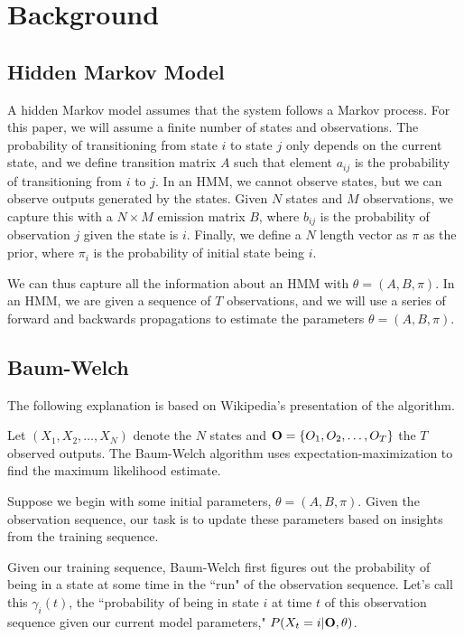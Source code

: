 \section{Background}

\subsection{Hidden Markov Model}
A hidden Markov model assumes that the system follows a Markov process. For this paper, we will assume a finite number of states and observations. The probability of transitioning from state $i$ to state $j$ only depends on the current state, and we define transition matrix $A$ such that element $a_{ij}$ is the probability  of transitioning from $i$ to $j$. In an HMM, we cannot observe states, but we can observe outputs generated by the states. Given $N$ states and $M$ observations, we capture this with a $N \times M$ emission matrix $B$, where $b_{ij}$ is the probability of observation $j$ given the state is $i$. Finally, we define a $N$ length vector as $\pi$ as the prior, where $\pi_i$ is the probability of initial state being $i$. 

We can thus capture all the information about an HMM with $\theta = (A, B, \pi)$. In an HMM, we are given a sequence of $T$ observations, and we will use a series of forward and backwards propagations to estimate the parameters $\theta = (A, B, \pi)$.

\subsection{Baum-Welch}

The following explanation is based on Wikipedia's presentation of the algorithm. \cite{bwwiki}

Let $(X_1, X_2, \ldots, X_N)$ denote the $N$ states and $\bold{O} = \{O_1, O_2, \ldots, O_T\}$ the $T$ observed outputs. The Baum-Welch algorithm uses expectation-maximization to find the maximum likelihood estimate.

Suppose we begin with some initial parameters, $\theta  =  (A, B, \pi)$.  Given the observation sequence, our task is to update these parameters based on insights from the training sequence.  

Given our training sequence, Baum-Welch first figures out the probability of being in a state at some time in the ``run" of the observation sequence.  Let's call this $\gamma_{i}(t)$, the ``probability of being in state $i$ at time $t$ of this observation sequence given our current model parameters," $P(X_t = i | \bold{O}, \theta)$.

